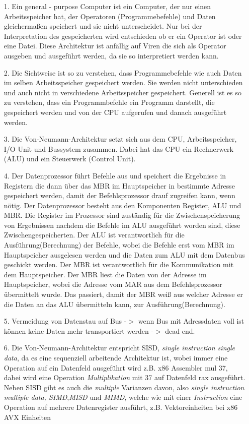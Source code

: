 \documentclass[11pt]{article}
\begin{document}
\begin{enumerate}
\item[1.] Ein general - purpose Computer ist ein Computer, der nur einen Arbeitsspeicher hat, der Operatoren (Programmebefehle) und Daten gleichermaßen speichert und sie nicht unterscheidet. Nur bei der Interpretation des gespeicherten wird entschieden ob er ein Operator ist oder eine Datei. Diese Architektur ist anfällig auf Viren die sich als Operator ausgeben und ausgeführt werden, da sie so interpretiert werden kann.
\item[2.] Die Sichtweise ist so zu verstehen, dass Programmebefehle wie auch Daten im selben Arbeitsspeicher gespeichert werden. Sie werden nicht unterschieden und auch nicht in verschiedene Arbeitsspeicher gespeichert. Generell ist es so zu verstehen, dass ein Programmbefehle ein Programm darstellt, die gespeichert werden und von der CPU aufgerufen und danach ausgeführt werden.
\item[3.] Die Von-Neumann-Architektur setzt sich aus dem CPU, Arbeitsspeicher, I/O Unit und Bussystem zusammen. Dabei hat das CPU ein Rechnerwerk (ALU) und ein Steuerwerk (Control Unit).
\item[4.] Der Datenprozessor führt Befehle aus und speichert die Ergebnisse in Registern die dann über das MBR im Hauptspeicher in bestimmte Adresse gespeichert werden, damit der Befehlsprozessor drauf zugreifen kann, wenn nötig. Der Datenprozessor besteht aus den Komponenten  Register, ALU und MBR. Die Register im Prozessor sind zuständig für die Zwischenspeicherung von Ergebnissen nachdem die Befehle im ALU ausgeführt worden sind, diese Zwischengespeicherten. Der ALU ist verantwortlich für die Ausführung(Berechnung) der Befehle, wobei die Befehle erst vom MBR im Hauptspeicher ausgelesen werden und die Daten zum ALU mit dem Datenbus geschickt werden. Der MBR ist verantwortlich für die Kommunikation mit dem Hauptspeicher. Der MBR liest die Daten von der Adresse im Hauptspeicher, wobei die Adresse vom MAR aus dem Befehlsprozessor übermittelt wurde. Das passiert, damit der MBR weiß aus welcher Adresse er die Daten an das ALU übermitteln kann, zur Ausführung(Berechnung).
\item[5.] Vermeidung von Datenstau auf Bus -$>$ wenn Bus mit Adressdaten voll ist können keine Daten mehr transportiert werden -$>$ dead end.
\item[6.] Die Von-Neumann-Architektur entspricht SISD, \textit{single instruction single data}, da es eine sequenziell arbeitende Architektur ist, wobei immer eine Operation auf ein Datenfeld ausgeführt wird z.B. x86 Assembler mul 37, dabei wird eine Operation \textit{Multiplikation} mit 37 auf Datenfeld rax ausgeführt. Neben SISD gibt es auch die \textit{multiple} Varianzen davon, also \textit{single instruction multiple data, SIMD},\textit{MISD} und \textit{MIMD}, welche wie mit einer \textit{Instruction} eine Operation auf mehrere Datenregister ausführt, z.B. Vektoreinheiten bei x86 AVX Einheiten

\end{enumerate}
\end{document}
